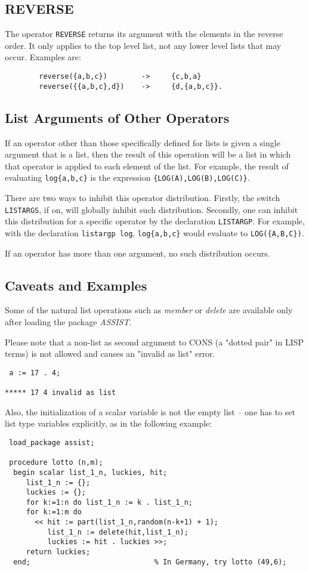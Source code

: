 \subsection{REVERSE}

The operator {\tt REVERSE} returns its argument with the
elements in the reverse order.  It only applies to the top level list, not
any lower level lists that may occur.  Examples are:
\begin{verbatim}
        reverse({a,b,c})        ->     {c,b,a}
        reverse({{a,b,c},d})    ->     {d,{a,b,c}}.
\end{verbatim}

\subsection{List Arguments of Other Operators}

If an operator other than those specifically defined for lists is given a
single argument that is a list, then the result of this operation will be
a list in which that operator is applied to each element of the list.  For
example, the result of evaluating {\tt log\{a,b,c\}} is the expression
{\tt \{LOG(A),LOG(B),LOG(C)\}}.

There are two ways to inhibit this operator distribution.  Firstly, the
switch {\tt LISTARGS}, if on, will globally inhibit
such distribution.  Secondly, one can inhibit this distribution for a
specific operator by the declaration {\tt LISTARGP}. For
example, with the declaration {\tt listargp log}, {\tt log\{a,b,c\}} would
evaluate to {\tt LOG(\{A,B,C\})}.

If an operator has more than one argument, no such distribution occurs.

\subsection{Caveats and Examples}

Some of the natural list operations such as {\it member} or {\it delete}
are available only after loading the package {\it ASSIST}.

Please note that a non-list as second argument to CONS
(a "dotted pair" in LISP terms) is not allowed
and causes an "invalid as list" error.
\begin{verbatim}
 a := 17 . 4;

***** 17 4 invalid as list
\end{verbatim}
Also, the initialization of a scalar variable is not the empty list --
one has to set list type variables explicitly, as in the following
example:
\begin{verbatim}
 load_package assist;

 procedure lotto (n,m);
  begin scalar list_1_n, luckies, hit;
     list_1_n := {};
     luckies := {};
     for k:=1:n do list_1_n := k . list_1_n;
     for k:=1:m do
       << hit := part(list_1_n,random(n-k+1) + 1);
          list_1_n := delete(hit,list_1_n);
          luckies := hit . luckies >>;
     return luckies;
  end;                             % In Germany, try lotto (49,6);
\end{verbatim}


